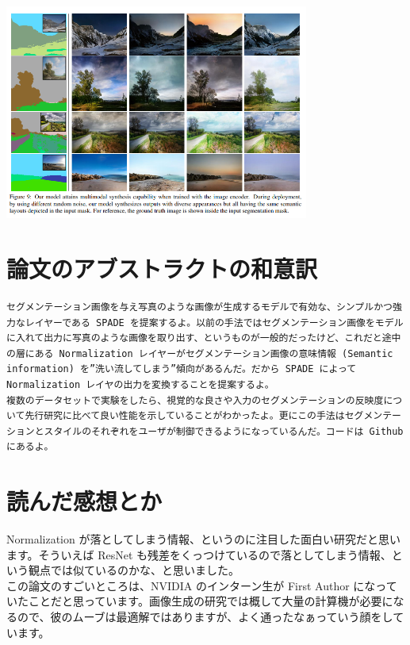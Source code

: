 \documentclass[a4paper, dvipdfmx, 10pt]{article}
\begin{document}
\begin{center}
\includegraphics[width=10cm]{./result2.png}
\end{center}
\section{論文のアブストラクトの和意訳}
\label{sec:org6ba2ab0}
\begin{verbatim}
セグメンテーション画像を与え写真のような画像が生成するモデルで有効な、シンプルかつ強力なレイヤーである SPADE を提案するよ。以前の手法ではセグメンテーション画像をモデルに入れて出力に写真のような画像を取り出す、というものが一般的だったけど、これだと途中の層にある Normalization レイヤーがセグメンテーション画像の意味情報 (Semantic information) を”洗い流してしまう”傾向があるんだ。だから SPADE によって Normalization レイヤの出力を変換することを提案するよ。
複数のデータセットで実験をしたら、視覚的な良さや入力のセグメンテーションの反映度について先行研究に比べて良い性能を示していることがわかったよ。更にこの手法はセグメンテーションとスタイルのそれぞれをユーザが制御できるようになっているんだ。コードは Github にあるよ。
\end{verbatim}

\section{読んだ感想とか}
\label{sec:org57241dc}
Normalization が落としてしまう情報、というのに注目した面白い研究だと思います。そういえば ResNet も残差をくっつけているので落としてしまう情報、という観点では似ているのかな、と思いました。\\

この論文のすごいところは、NVIDIA のインターン生が First Author になっていたことだと思っています。画像生成の研究では概して大量の計算機が必要になるので、彼のムーブは最適解ではありますが、よく通ったなぁっていう顔をしています。\\
\end{document}
